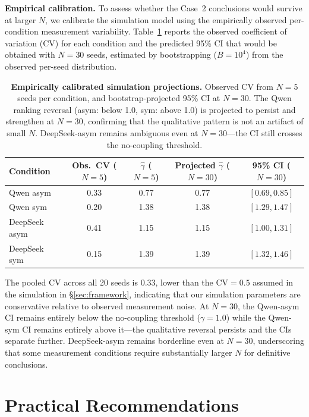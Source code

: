 \documentclass[11pt]{article}
\begin{document}
\textbf{Empirical calibration.} To assess whether the Case~2 conclusions would survive at larger $N$, we calibrate the simulation model using the empirically observed per-condition measurement variability. Table~\ref{tab:calibration} reports the observed coefficient of variation (CV) for each condition and the predicted 95\% CI that would be obtained with $N{=}30$ seeds, estimated by bootstrapping ($B{=}10^4$) from the observed per-seed distribution.

\begin{table}[h]
\centering
\caption{\textbf{Empirically calibrated simulation projections.} Observed CV from $N{=}5$ seeds per condition, and bootstrap-projected 95\% CI at $N{=}30$. The Qwen ranking reversal (asym: below 1.0, sym: above 1.0) is projected to persist and strengthen at $N{=}30$, confirming that the qualitative pattern is not an artifact of small $N$. DeepSeek-asym remains ambiguous even at $N{=}30$---the CI still crosses the no-coupling threshold.}
\label{tab:calibration}
\begin{tabular}{@{}lcccc@{}}
\toprule
Condition & Obs.\ CV ($N{=}5$) & $\hat{\gamma}$ ($N{=}5$) & Projected $\hat{\gamma}$ ($N{=}30$) & 95\% CI ($N{=}30$) \\
\midrule
Qwen asym      & 0.33 & 0.77 & 0.77 & $[0.69, 0.85]$ \\
Qwen sym       & 0.20 & 1.38 & 1.38 & $[1.29, 1.47]$ \\
DeepSeek asym  & 0.41 & 1.15 & 1.15 & $[1.00, 1.31]$ \\
DeepSeek sym   & 0.15 & 1.39 & 1.39 & $[1.32, 1.46]$ \\
\bottomrule
\end{tabular}
\end{table}

The pooled CV across all 20 seeds is 0.33, lower than the $\text{CV}{=}0.5$ assumed in the simulation in \S\ref{sec:framework}, indicating that our simulation parameters are conservative relative to observed measurement noise. At $N{=}30$, the Qwen-asym CI remains entirely below the no-coupling threshold ($\gamma{=}1.0$) while the Qwen-sym CI remains entirely above it---the qualitative reversal persists and the CIs separate further. DeepSeek-asym remains borderline even at $N{=}30$, underscoring that some measurement conditions require substantially larger $N$ for definitive conclusions.

\section{Practical Recommendations}
\label{sec:recommendations}
\end{document}
